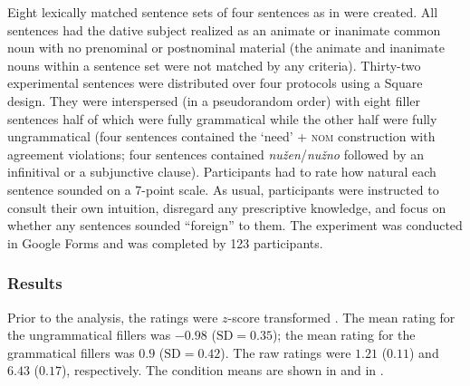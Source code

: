 \documentclass[output=paper,colorlinks,citecolor=brown]{langscibook}
\begin{document}
Eight lexically matched sentence sets of four sentences as in  were created. All sentences had the dative subject realized as an animate or inanimate common noun with no prenominal or postnominal material (the animate and inanimate nouns within a sentence set were not matched by any criteria). Thirty-two experimental sentences were distributed over four protocols using a  Square design. They were interspersed (in a pseudorandom order) with eight filler sentences half of which were fully grammatical while the other half were fully ungrammatical (four sentences contained the `need' + \textsc{nom} construction with agreement violations; four sentences contained \textit{nužen}/\textit{nužno} followed by an infinitival or a subjunctive clause). Participants had to rate how natural each sentence sounded on a 7-point scale. As usual, participants were instructed to consult their own intuition, disregard any prescriptive knowledge, and focus on whether any sentences sounded ``foreign'' to them. The experiment was conducted in Google Forms and was completed by 123 participants.

\subsubsection{Results}

Prior to the analysis, the ratings were $z$-score transformed \citep[see][]{Schuetze.Sprouse2014}. The mean rating for the ungrammatical fillers was $-0.98$ ($\text{SD}=0.35$); the mean rating for the grammatical fillers was $0.9$ ($\text{SD} =0.42$). The raw ratings were $1.21$ ($0.11$) and $6.43$ ($0.17$), respectively. The condition means are shown in  and in .

\end{document}
